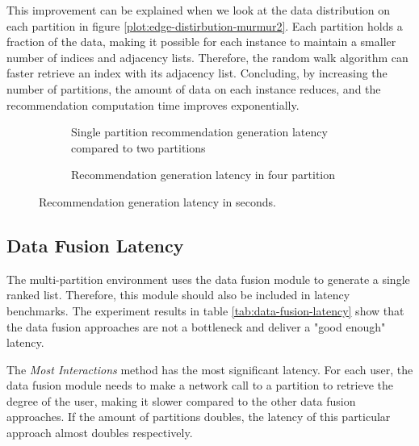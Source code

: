 This improvement can be explained when we look at the data distribution on each partition in figure \ref{plot:edge-distirbution-murmur2}. Each partition holds a fraction of the data, making it possible for each instance to maintain a smaller number of indices and adjacency lists. Therefore, the random walk algorithm can faster retrieve an index with its adjacency list. Concluding, by increasing the number of partitions, the amount of data on each instance reduces, and the recommendation computation time improves exponentially.

\begin{figure}[ht!]
    \centering
    \begin{subfigure}{\textwidth}
        \centering
        
        \caption{Single partition recommendation generation latency compared to two partitions}
        \label{plot:recommendation-latency-two-partitions}
    \end{subfigure}\qquad

    \begin{subfigure}{\textwidth}
        \centering
        
        \caption{Recommendation generation latency in four partition}
        \label{plot:recommendation-latency-four-partitions}
    \end{subfigure}\qquad
    \caption{Recommendation generation latency in seconds.}
    \label{plot:recommendation-latency}
\end{figure}



\subsection{Data Fusion Latency}
\label{subsec:data-fusion-latency}
The multi-partition environment uses the data fusion module to generate a single ranked list. Therefore, this module should also be included in latency benchmarks. The experiment results in table \ref{tab:data-fusion-latency} show that the data fusion approaches are not a bottleneck and deliver a "good enough" latency.


The \emph{Most Interactions} method has the most significant latency. For each user, the data fusion module needs to make a network call to a partition to retrieve the degree of the user, making it slower compared to the other data fusion approaches. If the amount of partitions doubles, the latency of this particular approach almost doubles respectively.


